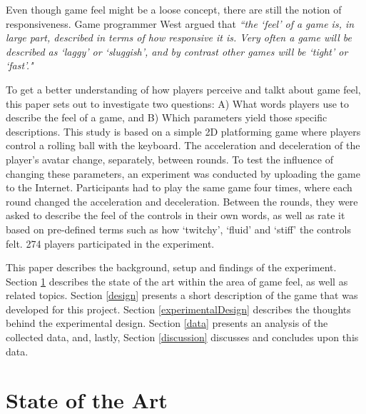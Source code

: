 Even though game feel might be a loose concept, there are still the notion of responsiveness. Game programmer West argued that \textit{``the `feel' of a game is, in large part, described in terms of how responsive it is. Very often a game will be described as `laggy' or `sluggish', and by contrast other games will be `tight' or `fast'."} \cite{measure_lag} 

To get a better understanding of how players perceive and talkt about game feel, this paper sets out to investigate two questions: A) What words players use to describe the feel of a game, and B) Which parameters yield those specific descriptions. This study is based on a simple 2D platforming game where players control a rolling ball with the keyboard. The acceleration and deceleration of the player's avatar change, separately, between rounds. To test the influence of changing these parameters, an experiment was conducted by uploading the game to the Internet. Participants had to play the same game four times, where each round changed the acceleration and deceleration. Between the rounds, they were asked to describe the feel of the controls in their own words, as well as rate it based on pre-defined terms such as how `twitchy', `fluid' and `stiff' the controls felt. 274 players participated in the experiment.


This paper describes the background, setup and findings of the experiment. Section \ref{stateOfTheArt} describes the state of the art within the area of game feel, as well as related topics. Section \ref{design} presents a short description of the game that was developed for this project. Section \ref{experimentalDesign} describes the thoughts behind the experimental design. Section \ref{data} presents an analysis of the collected data, and, lastly, Section \ref{discussion} discusses and concludes upon this data.

\section{State of the Art} \label{stateOfTheArt}

